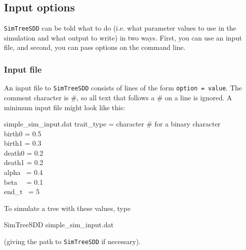 \documentclass[10pt]{article}
\begin{document}
\subsection*{Input options}

\texttt{SimTreeSDD} can be told what to do (i.e. what parameter values to use in the simulation and what output to write) in two ways.  First, you can use an input file, and second, you can pass options on the command line.

\subsubsection*{Input file}

An input file to \texttt{SimTreeSDD} consists of lines of the form \texttt{option = value}.  The comment character is \#, so all text that follows a \# on a line is ignored.  A minimum input file might look like this:
\begin{filesays}{simple\_sim\_input.dat}
	trait\_type = character \# for a binary character \\
	birth0  = 0.5  \\
	birth1  = 0.3  \\
	death0  = 0.2  \\
	death1  = 0.2  \\
	alpha \  = 0.4  \\
	beta \ \  = 0.1  \\
	end\_t \ = 5 
\end{filesays}

To simulate a tree with these values, type
\begin{commandis}
	SimTreeSDD simple\_sim\_input.dat
\end{commandis}
(giving the path to \texttt{SimTreeSDD} if necessary).
\end{document}
